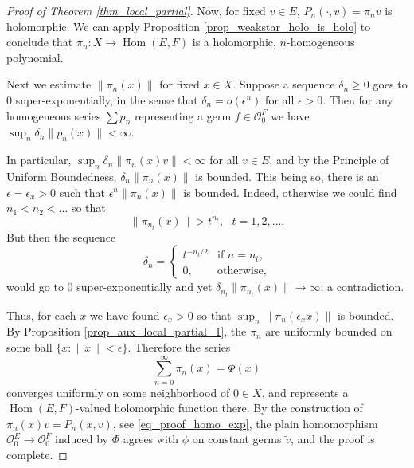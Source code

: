 \documentclass{amsart}
\numberwithin{equation}{section}
\theoremstyle{definition}
\theoremstyle{plain}
\theoremstyle{remark}
\begin{document}
\begin{proof}[Proof of Theorem \ref{thm_local_partial}]
Now, for fixed $v\in E$, $P_n(\cdot,v)=\pi_nv$ is holomorphic.
We can apply Proposition \ref{prop_weakstar_holo_is_holo} to
conclude that $\pi_n:X\rightarrow {{\mathop{\mathrm{Hom}}}}(E,F)$ is a holomorphic,
$n$-homogeneous polynomial.

Next we estimate $\|\pi_n(x)\|$ for fixed $x\in X$. 
Suppose a sequence $\delta_n\geq 0$ goes to 0 super-exponentially,
in the sense that $\delta_n=o(\epsilon^n)$ for all $\epsilon>0$.
Then for any homogeneous series $\sum p_n$ representing a germ 
$f\in {\ensuremath{\mathcal{{O}}}}^F_0$ we have $\sup_n \delta_n\|p_n(x)\|<\infty$.

In particular, $\sup_n \delta_n\|\pi_n(x)v\|<\infty$ for all $v\in E$,
and by the Principle of Uniform Boundedness, $\delta_n\|\pi_n(x)\|$
is bounded. This being so, there is an $\epsilon=\epsilon_x>0$
such that $\epsilon^n\|\pi_n(x)\|$ is bounded. Indeed,
otherwise we could find $n_1<n_2<\ldots$ so that 
\[
	\|\pi_{n_t}(x)\|>t^{n_t}, \text{ } t=1,2,\ldots.
\]
But then the sequence 
\[
	\delta_n=\left\{\begin{array}{cc} 	t^{-n_t/2} &\text{if }n=n_t,\\
				     	0,&\text{otherwise,}
			\end{array}\right.
\]
would go to $0$ super-exponentially and yet $\delta_{n_t}\|\pi_{n_t}(x)\|\rightarrow\infty$; a contradiction.

Thus, for each $x$ we have found $\epsilon_x>0$ so that $\sup_n\|\pi_n(\epsilon_x x)\|$  is bounded. By Proposition \ref{prop_aux_local_partial_1},
the $\pi_n$ are uniformly bounded on some ball $\{x:\|x\|<\epsilon\}$.
Therefore the series 
\[
	\sum_{n=0}^\infty \pi_n(x)=\Phi(x)
\]
converges uniformly on some neighborhood of $0\in X$, and represents a 
${{\mathop{\mathrm{Hom}}}}(E,F)$-valued holomorphic function there.
By the construction of $\pi_n(x)v=P_n(x,v)$, see \eqref{eq_proof_homo_exp},
the plain homomorphism 
${\ensuremath{\mathcal{{O}}}}^E_0\rightarrow {\ensuremath{\mathcal{{O}}}}^F_0$
induced by $\Phi$ agrees with $\phi$ on constant germs $\tilde v$, and the proof
is complete.
\end{proof}
\end{document}
